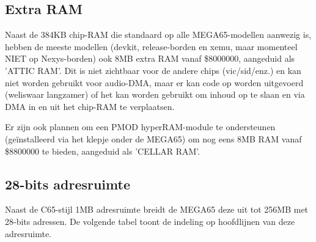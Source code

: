 \subsection{Extra RAM}

Naast de 384KB chip-RAM die standaard op alle MEGA65-modellen aanwezig is, hebben de meeste modellen (devkit, release-borden en xemu, maar momenteel NIET op Nexys-borden) ook 8MB extra RAM vanaf \$8000000, aangeduid als 'ATTIC RAM'. Dit is niet zichtbaar voor de andere chips (vic/sid/enz.) en kan niet worden gebruikt voor audio-DMA, maar er kan code op worden uitgevoerd (weliswaar langzamer) of het kan worden gebruikt om inhoud op te slaan en via DMA in en uit het chip-RAM te verplaatsen.

Er zijn ook plannen om een PMOD hyperRAM-module te ondersteunen (geïnstalleerd via het klepje onder de MEGA65) om nog eens 8MB RAM vanaf \$8800000 te bieden, aangeduid als 'CELLAR RAM'.

\subsection{28-bits adresruimte}

Naast de C65-stijl 1MB adresruimte breidt de MEGA65 deze uit tot 256MB met 28-bits adressen. De volgende tabel toont de indeling op hoofdlijnen van deze adresruimte.

